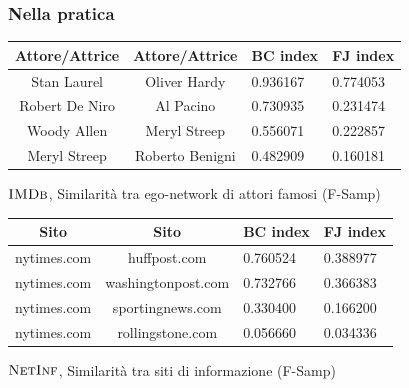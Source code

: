 \begin{frame}
	\frametitle{Nella pratica}
	\centering
	\begin{table}[h]
		\centering
		\begin{tabular}{c|c|l|l}
			Attore/Attrice & Attore/Attrice  & BC index & FJ index \\ 
			\hline
			Stan Laurel    & Oliver Hardy    & 0.936167 & 0.774053 \\
			Robert De Niro & Al Pacino       & 0.730935 & 0.231474 \\
			Woody Allen    & Meryl Streep    & 0.556071 & 0.222857 \\
			Meryl Streep   & Roberto Benigni & 0.482909 & 0.160181 \\
		\end{tabular}
		\medskip
		
		$\textsc{IMDb}$, Similarità tra ego-network di attori famosi (F-Samp)
	\end{table}


	\begin{table}[h]
		\centering
		\begin{tabular}{c|c|l|l}
			Sito           & Sito            & BC index & FJ index \\ 
			\hline
			nytimes.com  & huffpost.com       & 0.760524 & 0.388977 \\
			nytimes.com  & washingtonpost.com & 0.732766 & 0.366383 \\
			nytimes.com  & sportingnews.com   & 0.330400 & 0.166200\\
			nytimes.com  & rollingstone.com   & 0.056660 & 0.034336 \\
		\end{tabular}
		\medskip
		
		$\textsc{NetInf}$, Similarità tra siti di informazione (F-Samp)
	\end{table}

\end{frame}

